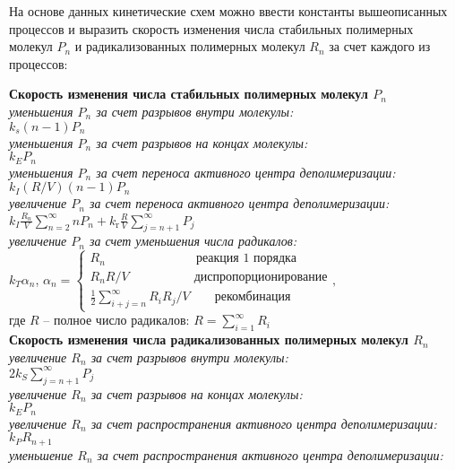 На основе данных кинетические схем можно ввести константы вышеописанных процессов и выразить скорость изменения числа стабильных полимерных молекул $P_n$ и радикализованных полимерных молекул $R_n$ за счет каждого из процессов:
\begin{center}
	\textbf{Скорость изменения числа стабильных полимерных молекул $P_n$} \\
	\textit{уменьшения $P_n$ за счет разрывов внутри молекулы:} \\
	$k_s (n-1) P_n$ \\
	\textit{уменьшения $P_n$ за счет разрывов на концах молекулы:} \\
	$k_E P_n$ \\
	\textit{уменьшения $P_n$ за счет переноса активного центра деполимеризации:} \\
	$k_I(R / V)(n-1) P_n$ \\
	\textit{увеличение $P_n$ за счет переноса активного центра деполимеризации:} \\
	{$\displaystyle k_I \frac{R_n}{V} \sum_{n=2}^{\infty} n P_n + k_{\mathrm{r}} \frac{R}{V} \sum_{j=n+1}^{\infty} P_j$} \\
	\textit{увеличение $P_n$ за счет уменьшения числа радикалов:} \\
	$k_T \alpha_n$, $\alpha_n = \left\{
	\begin{array}{l}
		R_n \quad\quad\quad\quad\quad\quad\quad\: \text{реакция 1 порядка} \\
		R_n R / V \quad\quad\quad\quad\quad\: \text{диспропорционирование} \\
		{\displaystyle \frac{1}{2} \sum_{i+j=n}^{\infty} R_i R_j / V} \quad\quad \text{рекомбинация}
	\end{array}\right.,$ \\
	где $R$ -- полное число радикалов: {$\displaystyle R = \sum_{i=1}^{\infty} R_i$} \\
	\textbf{Скорость изменения числа радикализованных полимерных молекул $R_n$} \\
	\textit{увеличение $R_n$ за счет разрывов внутри молекулы:} \\
	$2 k_S \sum_{j=n+1}^{\infty} P_j$ \\
	\textit{увеличение $R_n$ за счет разрывов на концах молекулы:} \\
	$k_E P_n$ \\
	\textit{увеличение $R_n$ за счет распространения активного центра деполимеризации:} \\
	$k_P R_{n+1}$ \\
	\textit{уменьшение $R_n$ за счет распространения активного центра деполимеризации:} \\

\end{center}

